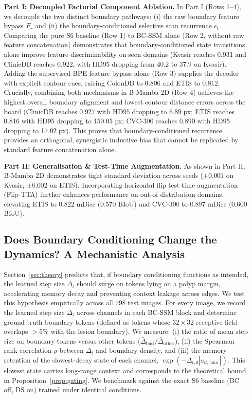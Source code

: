 \documentclass[journal]{IEEEtran}
\newcommand{\Dt}{\Delta}
\begin{document}
\textbf{Part I: Decoupled Factorial Component Ablation.} In Part I (Rows 1--4), we decouple the two distinct boundary pathways: (i) the raw boundary feature bypass $F_r$ and (ii) the boundary-conditioned selective scan recurrence $e_t$.
Comparing the pure S6 baseline (Row 1) to BC-SSM alone (Row 2, without raw feature concatenation) demonstrates that boundary-conditioned state transitions alone improve feature discriminability on seen domains (Kvasir reaches 0.931 and ClinicDB reaches 0.922, with HD95 dropping from 40.2 to 37.9 on Kvasir). Adding the supervised BPE feature bypass alone (Row 3) supplies the decoder with explicit contour cues, raising ColonDB to 0.806 and ETIS to 0.812. Crucially, combining both mechanisms in B-Mamba 2D (Row 4) achieves the highest overall boundary alignment and lowest contour distance errors across the board (ClinicDB reaches 0.927 with HD95 dropping to 6.89 px; ETIS reaches 0.816 with HD95 dropping to 150.05 px; CVC-300 reaches 0.890 with HD95 dropping to 17.02 px). This proves that boundary-conditioned recurrence provides an orthogonal, synergistic inductive bias that cannot be replicated by standard feature concatenation alone.

\textbf{Part II: Generalisation \& Test-Time Augmentation.} As shown in Part II, B-Mamba 2D demonstrates tight standard deviation across seeds ($\pm0.001$ on Kvasir, $\pm0.002$ on ETIS). Incorporating horizontal flip test-time augmentation (Flip-TTA) further enhances performance on out-of-distribution domains, elevating ETIS to 0.822 mDice (0.570 BIoU) and CVC-300 to 0.897 mDice (0.600 BIoU).

\subsection{Does Boundary Conditioning Change the Dynamics? A Mechanistic Analysis}
\label{sec:delta}
Section~\ref{sec:theory} predicts that, if boundary conditioning functions as intended, the learned step size $\Dt_t$ should surge on tokens lying on a polyp margin, accelerating memory decay and preventing context leakage across edges. We test this hypothesis empirically across all 798 test images. For every image, we record the learned step size $\Dt_t$ across channels in each BC-SSM block and determine ground-truth boundary tokens (defined as tokens whose $32\times32$ receptive field overlaps $>5\%$ with the lesion boundary). We measure: (i) the ratio of mean step size on boundary tokens versus other tokens ($\bar{\Dt}_{\text{bnd}}/\bar{\Dt}_{\text{other}}$), (ii) the Spearman rank correlation $\rho$ between $\Dt_t$ and boundary density, and (iii) the memory retention of the slowest-decay state of each channel, $\exp(-\Dt_{t,d} |a_{d,\min}|)$. This slowest state carries long-range context and corresponds to the theoretical bound in Proposition~\ref{prop:gating}. We benchmark against the exact S6 baseline (BC off, DS on) trained under identical conditions.
\end{document}
